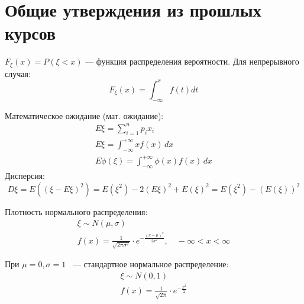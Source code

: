 \section{Общие утверждения из прошлых курсов}

\begin{definition}
\leavevmode

$F_\xi(x) = P(\xi < x)$ --- функция распределения вероятности.
Для непрерывного случая:
$$ F_\xi(x) = \int_{-\infty}^{x} f(t) dt $$
\end{definition}

\begin{definition}
\leavevmode

Математическое ожидание (мат. ожидание):
\begin{gather*}
E\xi = \sum_{i=1}^{n} p_i x_i \\
E\xi = \int_{-\infty}^{+\infty} x f(x) \, dx \\
E\phi(\xi) = \int_{-\infty}^{+\infty} \phi(x) f(x) \, dx
\end{gather*}
Дисперсия:
$$ D\xi = E\left((\xi - E\xi)^2\right) = E(\xi^2) - 2(E\xi)^2 + E(\xi)^2 = E(\xi^2) - (E(\xi))^2 $$
\end{definition}

\begin{definition}
\leavevmode

Плотность нормального распределения:
\begin{gather*}
\xi \sim N(\mu, \sigma)\\
f(x) = \frac{1}{\sqrt{2\pi\sigma^2}} \cdot e^{-\frac{(x-\mu)^2}{2\sigma^2}}, \quad -\infty < x < \infty 
\end{gather*}

При $\mu=0, \sigma=1$ ~--- стандартное нормальное распределение:
\begin{gather*}
\xi \sim N(0, 1) \\
f(x) = \frac{1}{\sqrt{2\pi}} \cdot e^{-\frac{x^2}{2}}
\end{gather*}


\end{definition}
